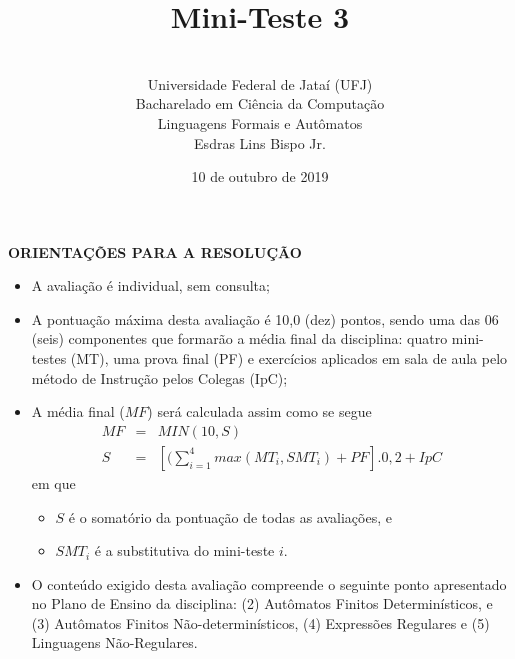 \documentclass[12pt,a4paper,oneside]{article}
\author{\\Universidade Federal de Jataí (UFJ)\\Bacharelado em Ciência da Computação \\Linguagens Formais e Autômatos \\Esdras Lins Bispo Jr.}
\date{10 de outubro de 2019}
\title{\sc \huge Mini-Teste 3}
\begin{document}
\maketitle

{\bf ORIENTAÇÕES PARA A RESOLUÇÃO}

\small
 
\begin{itemize}
	\item A avaliação é individual, sem consulta;
	\item A pontuação máxima desta avaliação é 10,0 (dez) pontos, sendo uma das 06 (seis) componentes que formarão a média final da disciplina: quatro mini-testes (MT), uma prova final (PF) e exercícios aplicados em sala de aula pelo método de Instrução pelos Colegas (IpC);
	\item A média final ($MF$) será calculada assim como se segue
	\begin{eqnarray}
		MF & = & MIN(10, S) \nonumber \\
		S & = & [(\sum_{i=1}^{4} max(MT_i, SMT_i ) + PF].0,2  + IpC\nonumber
	\end{eqnarray}
	em que 
	\begin{itemize}
		\item $S$ é o somatório da pontuação de todas as avaliações, e
		\item $SMT_i$ é a substitutiva do mini-teste $i$.
	\end{itemize}
	\item O conteúdo exigido desta avaliação compreende o seguinte ponto apresentado no Plano de Ensino da disciplina: (2) Autômatos Finitos Determinísticos, e (3) Autômatos Finitos Não-determinísticos, (4) Expressões Regulares e (5) Linguagens Não-Regulares.
\end{itemize}

\begin{center}
\end{center}

\newpage
\end{document}
